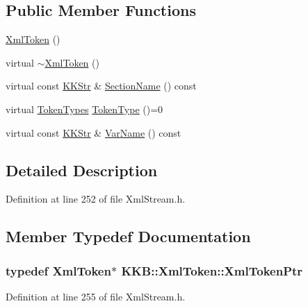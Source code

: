 \subsection*{Public Member Functions}
\begin{DoxyCompactItemize}
\item 
\hyperlink{class_k_k_b_1_1_xml_token_ad865182b75127e6996f9e4dd27b87d91}{Xml\+Token} ()
\item 
virtual \hyperlink{class_k_k_b_1_1_xml_token_a9af8fae85eeb414770bb62592c45922a}{$\sim$\+Xml\+Token} ()
\item 
virtual const \hyperlink{class_k_k_b_1_1_k_k_str}{K\+K\+Str} \& \hyperlink{class_k_k_b_1_1_xml_token_a20aa05209eeafb58c1c595c15f07d504}{Section\+Name} () const 
\item 
virtual \hyperlink{class_k_k_b_1_1_xml_token_a18b6e90c919f4b92e3b024f50f247f62}{Token\+Types} \hyperlink{class_k_k_b_1_1_xml_token_ae98e2c1a798882647578cae4adcd7176}{Token\+Type} ()=0
\item 
virtual const \hyperlink{class_k_k_b_1_1_k_k_str}{K\+K\+Str} \& \hyperlink{class_k_k_b_1_1_xml_token_a28b39cfdfa2ed63048a812b1cb52263c}{Var\+Name} () const 
\end{DoxyCompactItemize}


\subsection{Detailed Description}


Definition at line 252 of file Xml\+Stream.\+h.



\subsection{Member Typedef Documentation}
\subsubsection[{\texorpdfstring{Xml\+Token\+Ptr}{XmlTokenPtr}}]{\setlength{\rightskip}{0pt plus 5cm}typedef {\bf Xml\+Token}$\ast$ {\bf K\+K\+B\+::\+Xml\+Token\+::\+Xml\+Token\+Ptr}}\hypertarget{class_k_k_b_1_1_xml_token_a2379a40d8ebd64e9125cf68e34da13ab}{}\label{class_k_k_b_1_1_xml_token_a2379a40d8ebd64e9125cf68e34da13ab}


Definition at line 255 of file Xml\+Stream.\+h.



